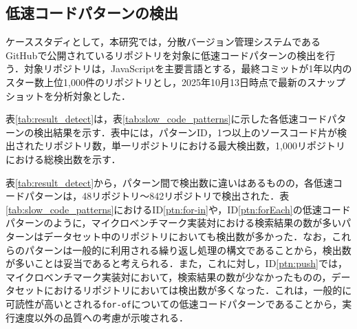 \documentclass[submit,techrep,noauthor]{ipsj}
\begin{document}
\subsection{低速コードパターンの検出}

ケーススタディとして，本研究では，分散バージョン管理システムであるGitHubで公開されているリポジトリを対象に低速コードパターンの検出を行う．対象リポジトリは，JavaScriptを主要言語とする，最終コミットが1年以内のスター数上位1,000件のリポジトリとし，2025年10月13日時点で最新のスナップショットを分析対象とした．

表\ref{tab:result_detect}は，表\ref{tab:slow_code_patterns}に示した各低速コードパターンの検出結果を示す．表中には，パターンID，1つ以上のソースコード片が検出されたリポジトリ数，単一リポジトリにおける最大検出数，1,000リポジトリにおける総検出数を示す．

表\ref{tab:result_detect}から，パターン間で検出数に違いはあるものの，各低速コードパターンは，48リポジトリ〜842リポジトリで検出された．表\ref{tab:slow_code_patterns}におけるID\ref{ptn:for-in}や，ID\ref{ptn:forEach}の低速コードパターンのように，マイクロベンチマーク実装対における検索結果の数が多いパターンはデータセット中のリポジトリにおいても検出数が多かった．なお，これらのパターンは一般的に利用される繰り返し処理の構文であることから，検出数が多いことは妥当であると考えられる．また，これに対し，ID\ref{ptn:push}では，マイクロベンチマーク実装対において，検索結果の数が少なかったものの，データセットにおけるリポジトリにおいては検出数が多くなった．これは，一般的に可読性が高いとされる\texttt{for-of}についての低速コードパターンであることから，実行速度以外の品質への考慮が示唆される．

\begin{table}[!h]
    \centering
    \caption{低速コードパターンに基づく検出結果}
    \label{tab:result_detect}
\end{table}
\end{document}
